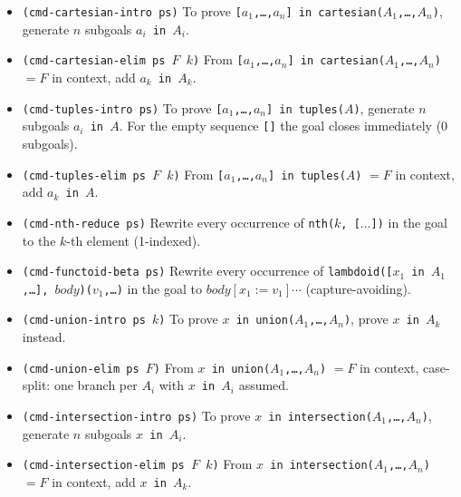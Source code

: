 \begin{itemize}

\item \begin{sloppypar}\texttt{(cmd-cartesian-intro ps)}
  To prove \texttt{[$a_1$,\ldots,$a_n$] in cartesian($A_1$,\ldots,$A_n$)},
  generate $n$ subgoals \texttt{$a_i$ in $A_i$}.\end{sloppypar}

\item \begin{sloppypar}\texttt{(cmd-cartesian-elim ps $F$\ $k$)}
  From \texttt{[$a_1$,\ldots,$a_n$] in cartesian($A_1$,\ldots,$A_n$)} $= F$
  in context, add \texttt{$a_k$ in $A_k$}.\end{sloppypar}

\item \texttt{(cmd-tuples-intro ps)}
  To prove \texttt{[$a_1$,\ldots,$a_n$] in tuples($A$)},
  generate $n$ subgoals \texttt{$a_i$ in $A$}.
  For the empty sequence \texttt{[]} the goal closes immediately (0 subgoals).

\item \begin{sloppypar}\texttt{(cmd-tuples-elim ps $F$\ $k$)}
  From \texttt{[$a_1$,\ldots,$a_n$] in tuples($A$)} $= F$
  in context, add \texttt{$a_k$ in $A$}.\end{sloppypar}

\item \texttt{(cmd-nth-reduce ps)}
  Rewrite every occurrence of \texttt{nth($k$, [$\ldots$])} in the goal to
  the $k$-th element (1-indexed).

\item \begin{sloppypar}\texttt{(cmd-functoid-beta ps)}
  Rewrite every occurrence of
  \texttt{lambdoid([$x_1$ in $A_1$,\ldots], $\mathit{body}$)($v_1$,\ldots)}
  in the goal to
  $\mathit{body}[x_1 := v_1]\cdots$ (capture-avoiding).\end{sloppypar}

\item \texttt{(cmd-union-intro ps $k$)}
  To prove \texttt{$x$ in union($A_1$,\ldots,$A_n$)},
  prove \texttt{$x$ in $A_k$} instead.

\item \texttt{(cmd-union-elim ps $F$)}
  From \texttt{$x$ in union($A_1$,\ldots,$A_n$)} $= F$ in context,
  case-split: one branch per $A_i$ with \texttt{$x$ in $A_i$} assumed.

\item \begin{sloppypar}\texttt{(cmd-intersection-intro ps)}
  To prove \texttt{$x$ in intersection($A_1$,\ldots,$A_n$)},
  generate $n$ subgoals \texttt{$x$ in $A_i$}.\end{sloppypar}

\item \begin{sloppypar}\texttt{(cmd-intersection-elim ps $F$\ $k$)}
  From \texttt{$x$ in intersection($A_1$,\ldots,$A_n$)} $= F$ in context,
  add \texttt{$x$ in $A_k$}.\end{sloppypar}

\end{itemize}

